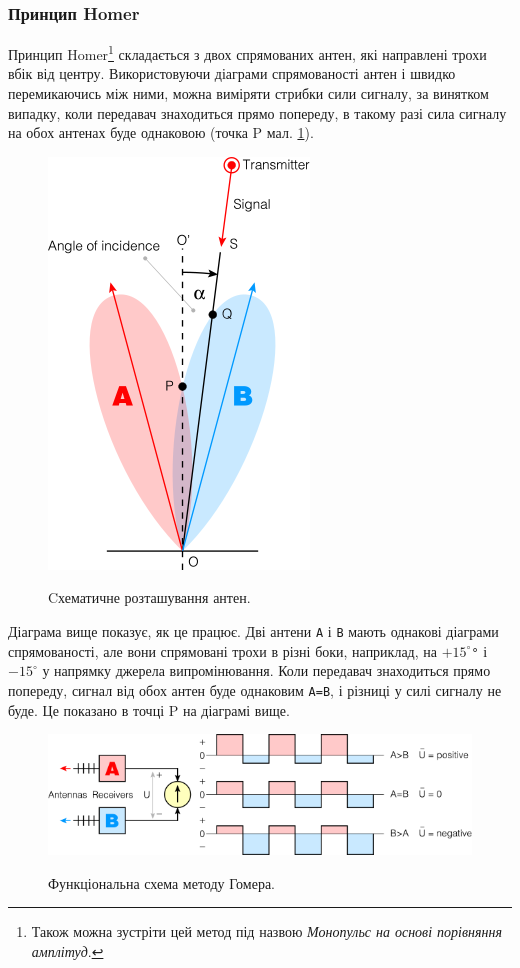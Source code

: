\documentclass{article}
\begin{document}
\subsubsection{Принцип Homer}
Принцип Homer\footnote{Також можна зустріти цей метод під назвою \textit{Монопульс на основі порівняння амплітуд}.} складається з двох спрямованих антен, які направлені трохи вбік від центру. Використовуючи діаграми спрямованості антен і швидко перемикаючись між ними, можна виміряти стрибки сили сигналу, за винятком випадку, коли передавач знаходиться прямо попереду, в такому разі сила сигналу на обох антенах буде однаковою (точка P мал. \ref{fig:homer}).

\begin{figure}[H]
\centering
{\includegraphics[width=0.3\linewidth]{images/homer.png}}
\caption{\label{fig:homer}Cхематичне розташування антен.}
\end{figure}

Діаграма вище показує, як це працює. Дві антени \texttt{A} і \texttt{B} мають однакові діаграми спрямованості, але вони спрямовані трохи в різні боки, наприклад, на \texttt{$+15^\circ$°} і \texttt{$-15^\circ$} у напрямку джерела випромінювання. Коли передавач знаходиться прямо попереду, сигнал від обох антен буде однаковим \texttt{A=B}, і різниці у силі сигналу не буде. Це показано в точці P на діаграмі вище.

\begin{figure}[H]
\centering
{\includegraphics[width=0.7\linewidth]{images/homer_meter.png}}
\caption{\label{fig:homer:meter}Функціональна схема методу Гомера.}
\end{figure}
\end{document}
